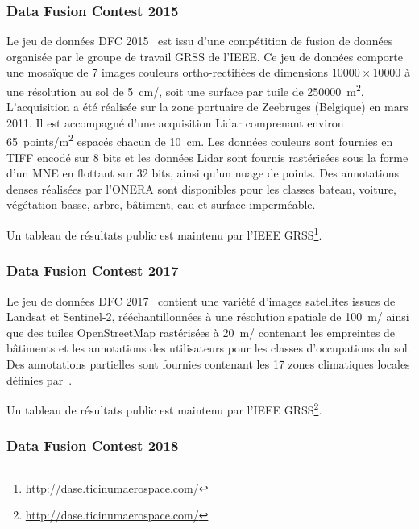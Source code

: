 \subsubsection{Data Fusion Contest 2015}

Le jeu de données \gls{DFC} 2015~\cite{campos-taberner_processing_2016} est issu d'une compétition de fusion de données organisée par le groupe de travail \gls{GRSS} de l'\gls{IEEE}. Ce jeu de données comporte une mosaïque de 7 images couleurs ortho-rectifiées de dimensions $10 000\times10 000$ à une résolution au sol de \SI{5}{\centi\meter/\px}, soit une surface par tuile de \SI{250 000}{\meter\squared}. L'acquisition a été réalisée sur la zone portuaire de Zeebruges (Belgique) en mars 2011. Il est accompagné d'une acquisition \gls{Lidar} comprenant environ \SI{65}{points/\meter\squared} espacés chacun de \SI{10}{\centi\meter}. Les données couleurs sont fournies en \gls{TIFF} encodé sur 8 bits et les données \gls{Lidar} sont fournis rastérisées sous la forme d'un \gls{MNE} en flottant sur 32 bits, ainsi qu'un nuage de points. Des annotations denses réalisées par l'\gls{ONERA} sont disponibles pour les classes bateau, voiture, végétation basse, arbre, bâtiment, eau et surface imperméable.

Un tableau de résultats public est maintenu par l'\gls{IEEE} \gls{GRSS}\footnote{\url{http://dase.ticinumaerospace.com/}}.

\subsubsection{Data Fusion Contest 2017}

Le jeu de données \gls{DFC} 2017~\cite{tuia_2017_2017} contient une variété d'images satellites issues de Landsat et Sentinel-2, rééchantillonnées à une résolution spatiale de \SI{100}{\meter/\px} ainsi que des tuiles OpenStreetMap rastérisées à \SI{20}{\meter/\px} contenant les empreintes de bâtiments et les annotations des utilisateurs pour les classes d'occupations du sol. Des annotations partielles sont fournies contenant les 17 zones climatiques locales définies par~\citet{stewart_local_2012}.

Un tableau de résultats public est maintenu par l'\gls{IEEE} \gls{GRSS}\footnote{\url{http://dase.ticinumaerospace.com/}}.

\subsubsection{Data Fusion Contest 2018}

